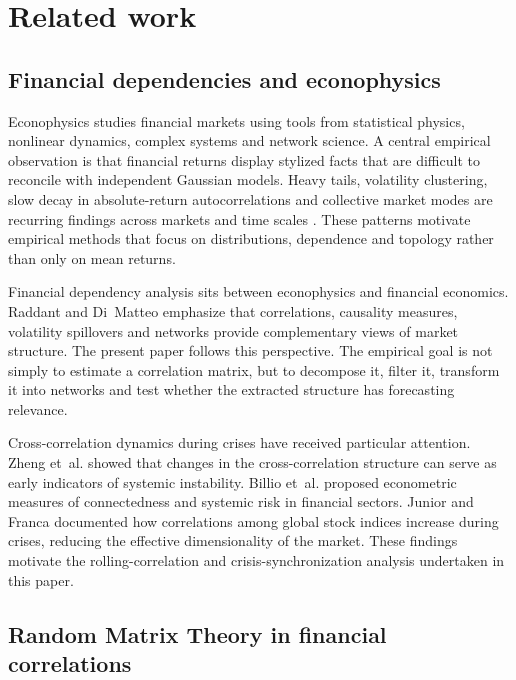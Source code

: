 \section{Related work}
\label{sec:related_work}

\subsection{Financial dependencies and econophysics}

Econophysics studies financial markets using tools from statistical physics, nonlinear dynamics, complex systems and network science. A central empirical observation is that financial returns display stylized facts that are difficult to reconcile with independent Gaussian models. Heavy tails, volatility clustering, slow decay in absolute-return autocorrelations and collective market modes are recurring findings across markets and time scales \cite{mantegna_stanley_1999_book,cont_2001_empirical}. These patterns motivate empirical methods that focus on distributions, dependence and topology rather than only on mean returns.

Financial dependency analysis sits between econophysics and financial economics. Raddant and Di~Matteo \cite{raddant_dimatteo_2023} emphasize that correlations, causality measures, volatility spillovers and networks provide complementary views of market structure. The present paper follows this perspective. The empirical goal is not simply to estimate a correlation matrix, but to decompose it, filter it, transform it into networks and test whether the extracted structure has forecasting relevance.

Cross-correlation dynamics during crises have received particular attention. Zheng et~al. \cite{zheng_2012_changes} showed that changes in the cross-correlation structure can serve as early indicators of systemic instability. Billio et~al. \cite{billio_2012_econometric} proposed econometric measures of connectedness and systemic risk in financial sectors. Junior and Franca \cite{junior_2012_correlation} documented how correlations among global stock indices increase during crises, reducing the effective dimensionality of the market. These findings motivate the rolling-correlation and crisis-synchronization analysis undertaken in this paper.

\subsection{Random Matrix Theory in financial correlations}

